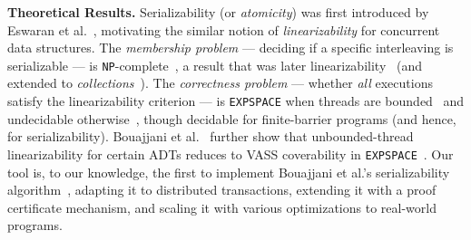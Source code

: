 
\smallskip
\noindent
\textbf{Theoretical Results.}
Serializability (or \emph{atomicity}) was
first introduced by Eswaran et al.~\cite{EsGrKoTr76},
motivating the similar notion of \emph{linearizability} for concurrent data structures. 
%
The \emph{membership problem} --- deciding if a specific interleaving is serializable --- is \texttt{NP}-complete~\cite{Pa79}, a result that was later 
linearizability~\cite{GiKo97} (and  
extended to \textit{collections}~\cite{EmEn18}). The \emph{correctness problem} --- whether \emph{all} executions satisfy the linearizability criterion --- is \texttt{EXPSPACE} when threads are bounded~\cite{AlMcPe96} and undecidable otherwise~\cite{BoEmEnHa13}, though decidable for finite-barrier programs (and hence, for serializability). Bouajjani et al.~\cite{BoEmEnHa18} further show that unbounded-thread linearizability for certain ADTs reduces to VASS coverability in \texttt{EXPSPACE}~\cite{Ra78}. Our tool is, to our knowledge, the first to implement Bouajjani et al.’s serializability algorithm~\cite{BoEmEnHa13}, adapting it to distributed transactions, extending it with a proof certificate mechanism, and scaling it with various optimizations to real-world programs. 

